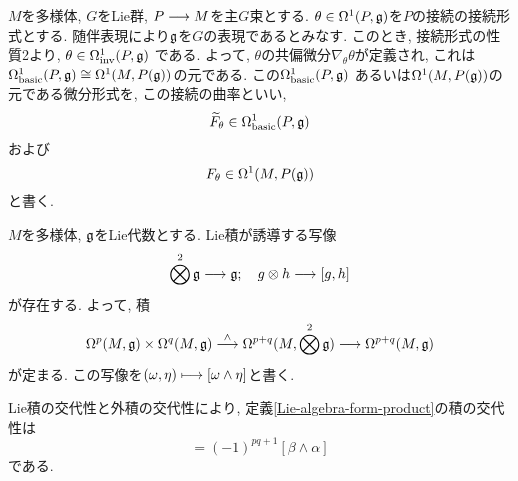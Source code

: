 \begin{dfn}
  $M$を多様体, $G$をLie群, $P \longrightarrow M$を主$G$束とする.
  $\theta \in \Omega^1(P, \mathfrak{g})$を$P$の接続の接続形式とする.
  随伴表現により$\mathfrak{g}$を$G$の表現であるとみなす.
  このとき, 接続形式の性質2より,
  $\theta \in \Omega^1_{\mathrm{inv}}(P, \mathfrak{g})$
  である.
  よって, $\theta$の共偏微分$\nabla_\theta \theta$が定義され, これは
  $\Omega^1_{\mathrm{basic}}(P, \mathfrak{g}) \cong \Omega^1(M, P(\mathfrak{g}))$の元である.
  この$\Omega^1_{\mathrm{basic}}(P, \mathfrak{g})$
  あるいは$\Omega^1(M, P(\mathfrak{g}))$の元である微分形式を, この接続の曲率といい,
  \begin{equation}
    \widetilde{F}_\theta \in \Omega^1_{\mathrm{basic}}(P, \mathfrak{g})
  \end{equation}
  および
  \begin{equation}
    F_\theta \in \Omega^1(M, P(\mathfrak{g}))
  \end{equation}
  と書く.
\end{dfn}

\begin{dfn}
  \label{Lie-algebra-form-product}
  $M$を多様体, $\mathfrak{g}$をLie代数とする.
  Lie積が誘導する写像
  \begin{equation}
  \bigotimes^2 \mathfrak{g} \longrightarrow \mathfrak{g}; \quad g \otimes h \longrightarrow [g, h]
  \end{equation}
  が存在する.
  よって, 積
  \begin{equation}
     \Omega^p(M, \mathfrak{g}) \times \Omega^q(M, \mathfrak{g})
     \stackrel{\wedge}{\longrightarrow} \Omega^{p+q}(M, \bigotimes^2\mathfrak{g})
     \longrightarrow \Omega^{p+q}(M, \mathfrak{g})
  \end{equation}
  が定まる.
  この写像を$(\omega, \eta) \longmapsto [\omega \wedge \eta]$と書く.
\end{dfn}

\begin{rem}
  \label{Lie-algebra-form-product-commutativity}
  Lie積の交代性と外積の交代性により, 定義\ref{Lie-algebra-form-product}の積の交代性は
  \begin{equation}
    [\alpha\wedge\beta]=(-1)^{pq+1}[\beta\wedge\alpha]
  \end{equation}
  である.
\end{rem}

